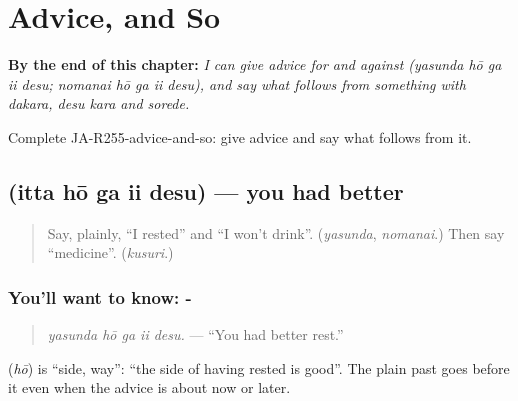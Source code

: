 
\chapter{Advice, and So}
\label{ch:ja-advice-and-so}

\begin{chapteropening}
\textbf{By the end of this chapter:} \emph{I can give advice for and against (yasunda hō ga ii desu; nomanai hō ga ii desu), and say what follows from something with dakara, desu kara and sorede.}

Complete JA-R255-advice-and-so: give advice and say what follows from it.
\end{chapteropening}

\section[\texorpdfstring{\ja{いった} \ja{ほうが} … (itta hō ga ii desu)}{いった ほうが … (itta hō ga ii desu)}]{   (itta hō ga ii desu) — you had better}

\label{lesson:JA-C255-itta-hou-ga-ii}



\begin{quote}
Say, plainly, \textquotedblleft{}I rested\textquotedblright{} and \textquotedblleft{}I won't drink\textquotedblright{}. (\emph{yasunda}, \emph{nomanai}.) Then say \textquotedblleft{}medicine\textquotedblright{}. (\emph{kusuri}.)
\end{quote}

\subsection*{You'll want to know: -  }
\begin{quote}
\textbf{  }
\end{quote}

\begin{quote}
\emph{yasunda hō ga ii desu.} — \textquotedblleft{}You had better rest.\textquotedblright{}
\end{quote}

\textbf{} (\emph{hō}) is \textquotedblleft{}side, way\textquotedblright{}: \textquotedblleft{}the side of having rested is good\textquotedblright{}. The plain past goes before it even when the advice is about now or later.

